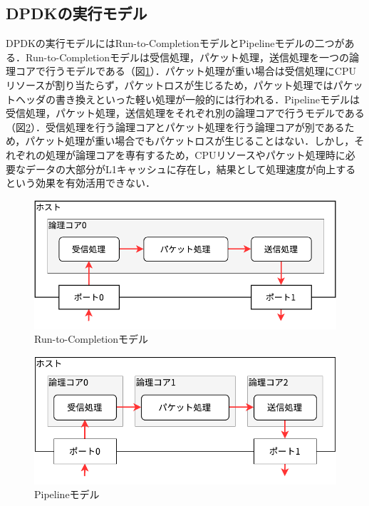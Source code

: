 \subsection{DPDKの実行モデル}
DPDKの実行モデルにはRun-to-CompletionモデルとPipelineモデルの二つがある．Run-to-Completionモデルは受信処理，パケット処理，送信処理を一つの論理コアで行うモデルである（図\ref{fig:RunToCompletion}）．パケット処理が重い場合は受信処理にCPUリソースが割り当たらず，パケットロスが生じるため，パケット処理ではパケットヘッダの書き換えといった軽い処理が一般的には行われる．Pipelineモデルは受信処理，パケット処理，送信処理をそれぞれ別の論理コアで行うモデルである（図\ref{fig:Pipeline}）．受信処理を行う論理コアとパケット処理を行う論理コアが別であるため，パケット処理が重い場合でもパケットロスが生じることはない．しかし，それぞれの処理が論理コアを専有するため，CPUリソースやパケット処理時に必要なデータの大部分がL1キャッシュに存在し，結果として処理速度が向上するという効果を有効活用できない．

\begin{figure}[htb]
  \centering
  \includegraphics[width=\columnwidth]{pictures/RunToCompletion.pdf}
  \caption{Run-to-Completionモデル}
  \label{fig:RunToCompletion}
\end{figure}

\begin{figure}[htb]
  \centering
  \includegraphics[width=\columnwidth]{pictures/Pipeline.pdf}
  \caption{Pipelineモデル}
  \label{fig:Pipeline}
\end{figure}

